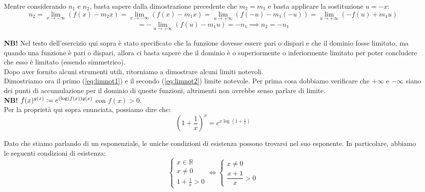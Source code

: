 \documentclass{article}
\begin{document}
\noindent Mentre considerando $n_1$ e $n_2$, basta sapere dalla dimostrazione precedente che $m_2 = m_1$ e basta applicare la sostituzione $u = -x$:
\begin{equation*}
    n_2 = \lim_{x \to -\infty} (f(x) - m_2x) = \lim_{x \to -\infty} (f(x) - m_1x) = \lim_{u \to +\infty} (f(-u) - m_1(-u)) = \lim_{u \to +\infty} (-f(u) + m_1u)
\end{equation*}
\begin{equation*}
    = - \lim_{u \to +\infty} (f(u) - m_1u) = -n_1 \implies n_2 = -n_1
\end{equation*}

\noindent\textbf{NB!} Nel testo dell'esercizio qui sopra è stato specificato che la funzione dovesse essere pari o dispari e che il dominio fosse limitato, ma quando una funzione è pari o dispari, allora ci basta sapere che il dominio è o superiormente o inferiormente limitato per poter concludere che esso è limitato (essendo simmetrico).\\

\noindent Dopo aver fornito alcuni strumenti utili, ritorniamo a dimostrare alcuni limiti notevoli.\\
Dimostriamo ora il primo (\ref{eq:limnot1}) e il secondo (\ref{eq:limnot2}) limite notevole. Per prima cosa dobbiamo verificare che $+\infty$ e $-\infty$ siano dei punti di accumulazione per il dominio di queste funzioni, altrimenti non avrebbe senso parlare di limite.\\

\noindent\textbf{NB!} $f(x)^{g(x)} \vcentcolon= e^{(\log(f(x))g(x)}$ con $f(x) > 0$.\\

\noindent Per la proprietà qui sopra enunciata, possiamo dire che:
\begin{equation*}
    \left(1 + \frac{1}{x}\right)^x = e^{x\log(1 + \frac{1}{x})}
\end{equation*}

\noindent Dato che stiamo parlando di un esponenziale, le uniche condizioni di esistenza possono trovarsi nel suo esponente. In particolare, abbiamo le seguenti condizioni di esistenza:
\begin{equation*}
    \begin{cases}
        x \in \mathbb{R}\\
        x \neq 0 \\
        1 + \frac{1}{x} > 0
    \end{cases}
    \iff
    \begin{cases}
        x \neq 0 \\
        \dfrac{x + 1}{x} > 0
    \end{cases}
\end{equation*}
\end{document}
